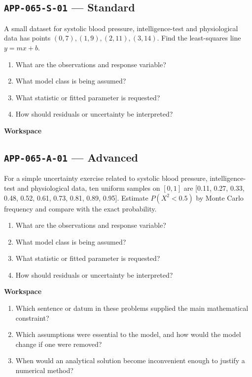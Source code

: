 \documentclass[11pt]{book}
\newcommand{\pid}[1]{\texttt{#1}}
\newcommand{\workspace}{\par\vspace{0.7in}\hrulefill\par\vspace{0.55in}\hrulefill\par}
\begin{document}
\subsection*{\pid{APP-065-S-01} — Standard}
\begin{problembox}
A small dataset for systolic blood pressure, intelligence-test and physiological data has points $(0,7),(1,9),(2,11),(3,14)$. Find the least-squares line $y=mx+b$.
\end{problembox}
\begin{promptbox}\begin{enumerate}
\item What are the observations and response variable?
\item What model class is being assumed?
\item What statistic or fitted parameter is requested?
\item How should residuals or uncertainty be interpreted?
\end{enumerate}\end{promptbox}
\textbf{Workspace}\workspace
{}
\subsection*{\pid{APP-065-A-01} — Advanced}
\begin{problembox}
For a simple uncertainty exercise related to systolic blood pressure, intelligence-test and physiological data, ten uniform samples on $[0,1]$ are [0.11, 0.27, 0.33, 0.48, 0.52, 0.61, 0.73, 0.81, 0.89, 0.95]. Estimate $P(X^2<0.5)$ by Monte Carlo frequency and compare with the exact probability.
\end{problembox}
\begin{promptbox}\begin{enumerate}
\item What are the observations and response variable?
\item What model class is being assumed?
\item What statistic or fitted parameter is requested?
\item How should residuals or uncertainty be interpreted?
\end{enumerate}\end{promptbox}
\textbf{Workspace}\workspace
\begin{reflectionbox}\begin{enumerate}
\item Which sentence or datum in these problems supplied the main mathematical constraint?
\item Which assumptions were essential to the model, and how would the model change if one were removed?
\item When would an analytical solution become inconvenient enough to justify a numerical method?
\end{enumerate}\end{reflectionbox}
\end{document}
